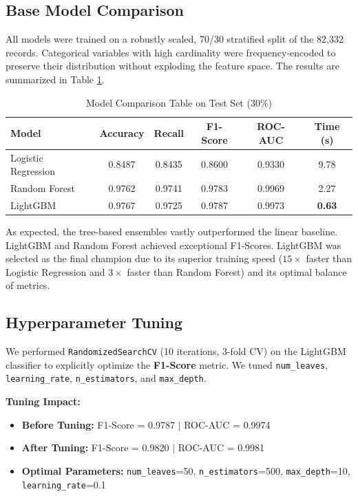 \documentclass[12pt, a4paper]{article}
\begin{document}
\subsection{Base Model Comparison}
All models were trained on a robustly scaled, 70/30 stratified split of the 82,332 records. Categorical variables with high cardinality were frequency-encoded to preserve their distribution without exploding the feature space. The results are summarized in Table \ref{tab:model_comparison}.

\begin{table}[h]
\centering
\begin{tabular}{|l|c|c|c|c|c|}
\hline
\textbf{Model} & \textbf{Accuracy} & \textbf{Recall} & \textbf{F1-Score} & \textbf{ROC-AUC} & \textbf{Time (s)} \\
\hline
Logistic Regression & 0.8487 & 0.8435 & 0.8600 & 0.9330 & 9.78 \\
Random Forest & 0.9762 & 0.9741 & 0.9783 & 0.9969 & 2.27 \\
LightGBM & 0.9767 & 0.9725 & 0.9787 & 0.9973 & \textbf{0.63} \\
\hline
\end{tabular}
\caption{Model Comparison Table on Test Set (30\%)}
\label{tab:model_comparison}
\end{table}

As expected, the tree-based ensembles vastly outperformed the linear baseline. LightGBM and Random Forest achieved exceptional F1-Scores. LightGBM was selected as the final champion due to its superior training speed ($15\times$ faster than Logistic Regression and $3\times$ faster than Random Forest) and its optimal balance of metrics.

\subsection{Hyperparameter Tuning}
We performed \texttt{RandomizedSearchCV} (10 iterations, 3-fold CV) on the LightGBM classifier to explicitly optimize the \textbf{F1-Score} metric. We tuned \texttt{num\_leaves}, \texttt{learning\_rate}, \texttt{n\_estimators}, and \texttt{max\_depth}.

\textbf{Tuning Impact:}
\begin{itemize}
    \item \textbf{Before Tuning:} F1-Score = 0.9787 $|$ ROC-AUC = 0.9974
    \item \textbf{After Tuning:} F1-Score = 0.9820 $|$ ROC-AUC = 0.9981
    \item \textbf{Optimal Parameters:} \texttt{num\_leaves}=50, \texttt{n\_estimators}=500, \texttt{max\_depth}=10, \texttt{learning\_rate}=0.1
\end{itemize}
\end{document}
